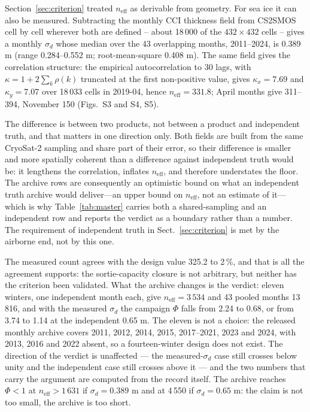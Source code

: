 \documentclass[preprint,12pt,authoryear]{elsarticle}
\begin{document}
Section~\ref{sec:criterion} treated $n_{\mathrm{eff}}$ as derivable from geometry. For sea ice it can also be measured. Subtracting the monthly CCI thickness field from CS2SMOS cell by cell wherever both are defined -- about 18\,000 of the $432\times432$ cells -- gives a monthly $\sigma_d$ whose median over the 43 overlapping months, 2011--2024, is 0.389 m (range 0.284--0.552 m; root-mean-square 0.408 m). The same field gives the correlation structure: the empirical autocorrelation to 30 lags, with $\kappa = 1+2\sum_k\rho(k)$ truncated at the first non-positive value, gives $\kappa_x = 7.69$ and $\kappa_y = 7.07$ over 18\,033 cells in 2019-04, hence $n_{\mathrm{eff}} = 331.8$; April months give 311--394, November 150 (Figs.~S3 and S4, S5).

The difference is between two products, not between a product and independent truth, and that matters in one direction only. Both fields are built from the same CryoSat-2 sampling and share part of their error, so their difference is smaller and more spatially coherent than a difference against independent truth would be: it lengthens the correlation, inflates $n_{\mathrm{eff}}$, and therefore understates the floor. The archive rows are consequently an optimistic bound on what an independent truth archive would deliver---an upper bound on $n_{\mathrm{eff}}$, not an estimate of it---which is why Table~\ref{tab:master} carries both a shared-sampling and an independent row and reports the verdict as a boundary rather than a number. The requirement of independent truth in Sect.~\ref{sec:criterion} is met by the airborne end, not by this one.

The measured count agrees with the design value 325.2 to 2\,\%, and that is all the agreement supports: the sortie-capacity closure is not arbitrary, but neither has the criterion been validated. What the archive changes is the verdict: eleven winters, one independent month each, give $n_{\mathrm{eff}} = 3\,534$ and 43 pooled months 13\,816, and with the measured $\sigma_d$ the campaign $\Phi$ falls from 2.24 to 0.68, or from 3.74 to 1.14 at the independent 0.65 m. The eleven is not a choice: the released monthly archive covers 2011, 2012, 2014, 2015, 2017--2021, 2023 and 2024, with 2013, 2016 and 2022 absent, so a fourteen-winter design does not exist. The direction of the verdict is unaffected --- the measured-$\sigma_d$ case still crosses below unity and the independent case still crosses above it --- and the two numbers that carry the argument are computed from the record itself. The archive reaches $\Phi<1$ at $n_{\mathrm{eff}} > 1\,631$ if $\sigma_d = 0.389$ m and at 4\,550 if $\sigma_d = 0.65$ m: the claim is not too small, the archive is too short.
\end{document}
